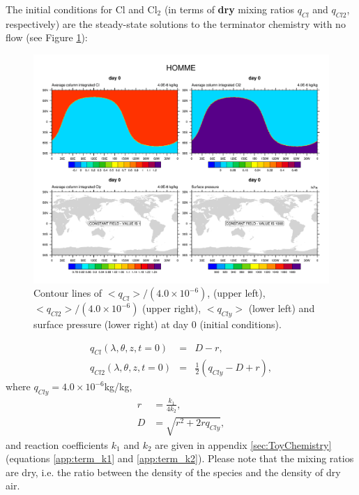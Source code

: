\documentclass[times,doublespace]{fldauth}
\begin{document}
The initial conditions for Cl and Cl$_2$ (in terms of {\bf{dry}} mixing ratios $q_{Cl}$ and $q_{Cl2}$, respectively) are the steady-state solutions to the terminator chemistry with no flow \cite{LCLVT2015GMD} (see Figure \ref{fig:terminator-2d-se-day0}):
\begin{figure}[t]
\includegraphics[width=\linewidth]{terminator-2d-se-day0.pdf}
\caption{Contour lines of $<q_{Cl}>/(4.0\times 10^{-6})$, (upper left), $<q_{Cl2}>/(4.0\times 10^{-6})$ (upper right), $<q_{Cly}>$ (lower left) and surface pressure (lower right) at day 0 (initial conditions).}
\label{fig:terminator-2d-se-day0}
\end{figure}
\begin{eqnarray}
q_{Cl}(\lambda,\theta,z,t=0)&=&D-r, \\
q_{Cl2}(\lambda,\theta,z,t=0)&=&\frac{1}{2}\left( q_{Cly} - D + r\right),
\end{eqnarray}
where $q_{Cly}=4.0\times 10^{-6}$kg/kg,
\begin{align}
 r &= \frac{k_1}{4 k_2}, \\
 D &= \sqrt{r^2 + 2 r q_{Cly}},
\end{align}
and reaction coefficients $k_1$ and $k_2$ are given in appendix \ref{sec:ToyChemistry} (equations \eqref{app:term_k1} and \eqref{app:term_k2}). Please note that the mixing ratios are dry, i.e. the ratio between the density of the species and the density of dry air. 
\end{document}
